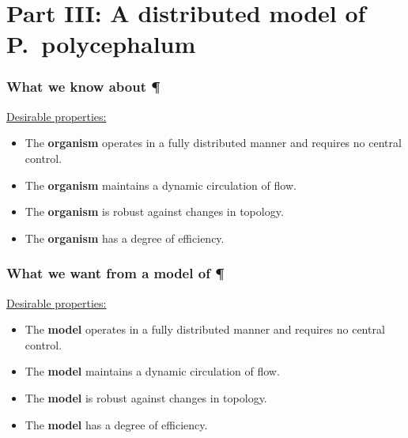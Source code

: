\documentclass[	hyperref={pdfpagelabels=false}, xcolor=dvipsnames,
		11pt]{beamer}
\begin{document}
\section{Part III: A distributed model of P.~polycephalum} 

\begin{frame}
    \frametitle{What we know about \P} 

	\begin{alertblock}{\underline{Desirable properties:}}
	 \begin{itemize}
	 	\item The \textbf{organism} operates in a fully distributed manner and requires no central control.
		\item The \textbf{organism} maintains a dynamic circulation of flow.
		\item The \textbf{organism} is robust against changes in topology.
		\item The \textbf{organism} has a degree of efficiency.
	 \end{itemize}
	\end{alertblock}
\end{frame}
\begin{frame}
    \frametitle{What we want from a model of \P} 

	\begin{alertblock}{\underline{Desirable properties:}}
	 \begin{itemize}
	 	\item The \textbf{model} operates in a fully distributed manner and requires no central control.
		\item The \textbf{model} maintains a dynamic circulation of flow.
		\item The \textbf{model} is robust against changes in topology.
		\item The \textbf{model} has a degree of efficiency.
	 \end{itemize}
	\end{alertblock}
\end{frame}
\end{document}
